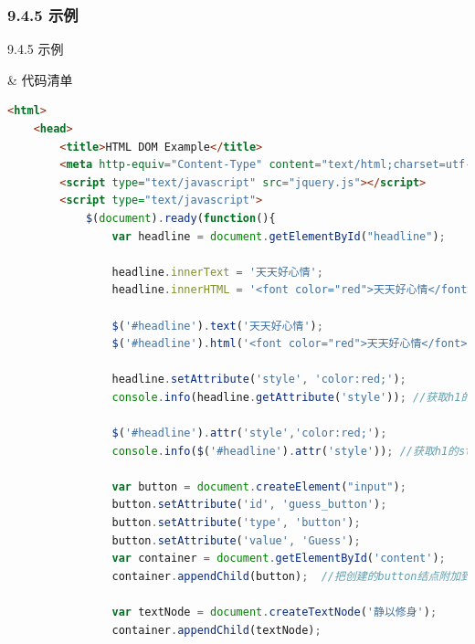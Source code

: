 \subsubsection{9.4.5 示例}
\begin{frame}{9.4.5 示例}
\begin{easylist} \easyitem
& 代码清单
\begin{lstlisting}[tabsize=8, basicstyle=\small\tt, language=HTML]
<html>
    <head>
        <title>HTML DOM Example</title>
        <meta http-equiv="Content-Type" content="text/html;charset=utf-8" />
        <script type="text/javascript" src="jquery.js"></script>
        <script type="text/javascript">
            $(document).ready(function(){
                var headline = document.getElementById("headline");
                
                headline.innerText = '天天好心情'; 
                headline.innerHTML = '<font color="red">天天好心情</font>'; 
            
                $('#headline').text('天天好心情'); 
                $('#headline').html('<font color="red">天天好心情</font>'); 
                
                headline.setAttribute('style', 'color:red;'); 
                console.info(headline.getAttribute('style')); //获取h1的style属性值
                
                $('#headline').attr('style','color:red;'); 
                console.info($('#headline').attr('style')); //获取h1的style属性值
                
                var button = document.createElement("input");
                button.setAttribute('id', 'guess_button'); 
                button.setAttribute('type', 'button'); 
                button.setAttribute('value', 'Guess'); 
                var container = document.getElementById('content'); 
                container.appendChild(button);  //把创建的button结点附加到id为content的元素下
                
                var textNode = document.createTextNode('静以修身'); 
                container.appendChild(textNode); 
                

\end{lstlisting}
\end{easylist}
\end{frame}
